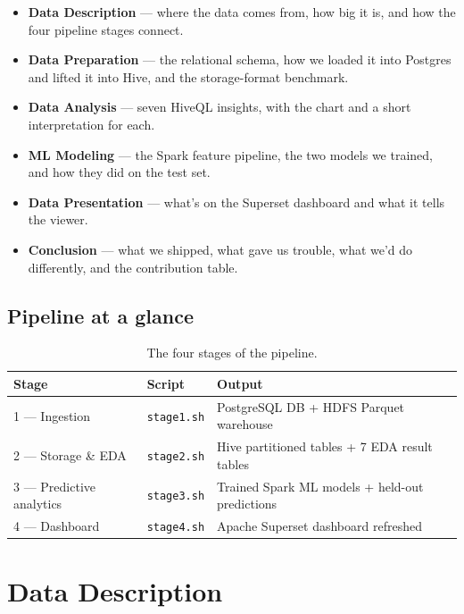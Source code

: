 \documentclass[11pt,a4paper]{article}
\begin{document}
\begin{itemize}[leftmargin=2em,itemsep=0.2em]
    \item \textbf{Data Description} --- where the data comes from, how big
    it is, and how the four pipeline stages connect.
    \item \textbf{Data Preparation} --- the relational schema, how we
    loaded it into Postgres and lifted it into Hive, and the storage-format
    benchmark.
    \item \textbf{Data Analysis} --- seven HiveQL insights, with the
    chart and a short interpretation for each.
    \item \textbf{ML Modeling} --- the Spark feature pipeline, the two
    models we trained, and how they did on the test set.
    \item \textbf{Data Presentation} --- what's on the Superset dashboard
    and what it tells the viewer.
    \item \textbf{Conclusion} --- what we shipped, what gave us trouble,
    what we'd do differently, and the contribution table.
\end{itemize}

\subsection{Pipeline at a glance}

\begin{table}[H]
\centering
\small
\begin{tabular}{lll}
\toprule
\textbf{Stage} & \textbf{Script} & \textbf{Output} \\
\midrule
1 --- Ingestion & \texttt{stage1.sh} & PostgreSQL DB + HDFS Parquet warehouse \\
2 --- Storage \& EDA & \texttt{stage2.sh} & Hive partitioned tables + 7 EDA result tables \\
3 --- Predictive analytics & \texttt{stage3.sh} & Trained Spark ML models + held-out predictions \\
4 --- Dashboard & \texttt{stage4.sh} & Apache Superset dashboard refreshed \\
\bottomrule
\end{tabular}
\caption{The four stages of the pipeline.}
\end{table}

\section{Data Description}
\end{document}
